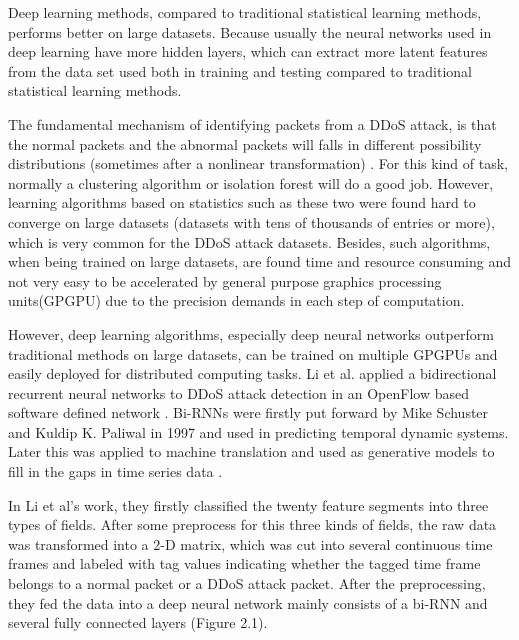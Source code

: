 \documentclass[paper=a4, fontsize=12pt]{scrartcl} %
\numberwithin{equation}{section} %
\numberwithin{figure}{section} %
\numberwithin{table}{section} %
\begin{document}
Deep learning methods, compared to traditional statistical learning methods, performs better on large datasets. Because usually the neural networks used in deep learning have more hidden layers, which can extract more latent features from the data set used both in training and testing compared to traditional statistical learning methods.

The fundamental mechanism of identifying packets from a DDoS attack, is that the normal packets and the abnormal packets will falls in different possibility distributions (sometimes after a nonlinear transformation) \cite{bishop:2006:PRML}. For this kind of task, normally a clustering algorithm or isolation forest  will do a good job. However, learning algorithms based on statistics such as these two were found hard to converge on large datasets (datasets with tens of thousands of entries or more), which is very common for the DDoS attack datasets. Besides, such algorithms, when being trained on large datasets, are found time and resource consuming and not very easy to be accelerated by general purpose graphics processing units(GPGPU) due to the precision demands in each step of computation.

However, deep learning algorithms, especially deep neural networks outperform traditional methods on large datasets, can be trained on multiple GPGPUs and easily deployed for distributed computing tasks. Li et al. applied a bidirectional recurrent neural networks to DDoS attack detection in an OpenFlow based software defined network \cite{li_detection_2018}. Bi-RNNs were firstly put forward by Mike Schuster and Kuldip K. Paliwal in 1997 \cite{Schuster:1997:BRN:2198065.2205129} and used in predicting temporal dynamic systems. Later this was applied to machine translation and used as generative models to fill in the gaps in time series data \cite{DBLP:journals/corr/BerglundRHKVK15}. 

In Li et al's work, they firstly classified the twenty feature segments into three types of fields. After some preprocess for this three kinds of fields, the raw data was transformed into a 2-D matrix, which was cut into several continuous time frames and labeled with tag values indicating whether the tagged time frame belongs to a normal packet or a DDoS attack packet. After the preprocessing, they fed the data into a deep neural network mainly consists of a bi-RNN and several fully connected layers (Figure 2.1)\cite{li_detection_2018}.
\end{document}
